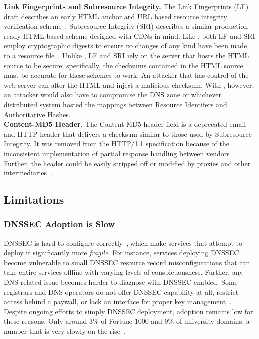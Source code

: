 \noindent\textbf{Link Fingerprints and Subresource Integrity.} The Link
Fingerprints (LF) draft describes an early HTML anchor and URL based resource
integrity verification scheme~\cite{LF}. Subresource Integrity (SRI) describes a
similar production-ready HTML-based scheme designed with CDNs in mind. Like
\SYSTEM{}, both LF and SRI employ cryptographic digests to ensure no changes of
any kind have been made to a resource file~\cite{SRI}. Unlike \SYSTEM{}, LF and
SRI rely on the server that hosts the HTML source to be secure; specifically,
the checksums contained in the HTML source must be accurate for these schemes to
work. An attacker that has control of the web server can alter the HTML and
inject a malicious checksum. With \SYSTEM{}, however, an attacker would also
have to compromise the DNS zone or whichever distributed system hosted the
mappings between Resource Identifers and Authoritative Hashes. \\

\noindent\textbf{Content-MD5 Header.} The Content-MD5 header field is a
deprecated email and HTTP header that delivers a checksum similar to those used
by Subresource Integrity. It was removed from the HTTP/1.1 specification because
of the inconsistent implementation of partial response handling between
vendors~\cite{HTTP1.1}. Further, the header could be easily stripped off or
modified by proxies and other intermediaries~\cite{MD5Header}.

\subsection{Limitations}

\subsubsection{DNSSEC Adoption is Slow}

DNSSEC is hard to configure correctly~\cite{DNSSEC-is-hard-1, DNSSEC-is-hard-2,
DNSSEC-is-hard-3, DNSSEC-is-hard-4}, which make services that attempt to deploy
it significantly more \textit{fragile}. For instance, services deploying DNSSEC
become vulnerable to small DNSSEC resource record misconfigurations that can
take entire services offline with varying levels of conspicuousness. Further,
any DNS-related issue becomes harder to diagnose with DNSSEC enabled. Some
registrars and DNS operators do not offer DNSSEC capability at all, restrict
access behind a paywall, or lack an interface for proper key
management~\cite{Cloudflare}. Despite ongoing efforts to simply DNSSEC
deployment, adoption remains low for these reasons. Only around 3\% of Fortune
1000 and 9\% of university domains, a number that is very slowly on the
rise~\cite{NIST}.

